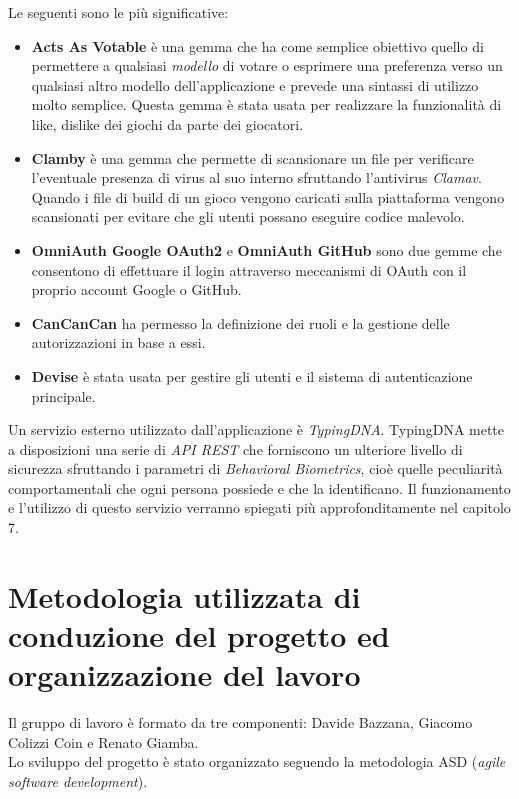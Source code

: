 Le seguenti sono le più significative:
\begin{itemize}
  \item \textbf{Acts As Votable} è una gemma che ha come semplice obiettivo quello di permettere a qualsiasi \textit{modello} di votare o esprimere una preferenza verso un qualsiasi altro modello dell'applicazione e prevede una sintassi di utilizzo molto semplice. Questa gemma è stata usata per realizzare la funzionalità di like, dislike dei giochi da parte dei giocatori.
  \item \textbf{Clamby} è una gemma che permette di scansionare un file per verificare l'eventuale presenza di virus al suo interno sfruttando l'antivirus \textit{Clamav}. Quando i file di build di un gioco vengono caricati sulla piattaforma vengono scansionati per evitare che gli utenti possano eseguire codice malevolo.
  \item \textbf{OmniAuth Google OAuth2} e \textbf{OmniAuth GitHub} sono due gemme che consentono di effettuare il login attraverso meccanismi di OAuth con il proprio account Google o GitHub.
  \item \textbf{CanCanCan} ha permesso la definizione dei ruoli e la gestione delle autorizzazioni in base a essi.
  \item \textbf{Devise} è stata usata per gestire gli utenti e il sistema di autenticazione principale.\cite{git}
\end{itemize}
Un servizio esterno utilizzato dall'applicazione è \textit{TypingDNA}. TypingDNA mette a disposizioni una serie di \textit{API REST} che forniscono un ulteriore livello di sicurezza sfruttando i parametri di \textit{Behavioral Biometrics}, cioè quelle peculiarità comportamentali che ogni persona possiede e che la identificano. Il funzionamento e l'utilizzo di questo servizio verranno spiegati più approfonditamente nel capitolo 7.

\section{Metodologia utilizzata di conduzione del progetto ed organizzazione del lavoro}

Il gruppo di lavoro è formato da tre componenti: Davide Bazzana,
Giacomo Colizzi Coin e Renato Giamba.\\

Lo sviluppo del progetto è stato organizzato seguendo la metodologia
ASD (\textit{agile software development}).\cite{saas}

